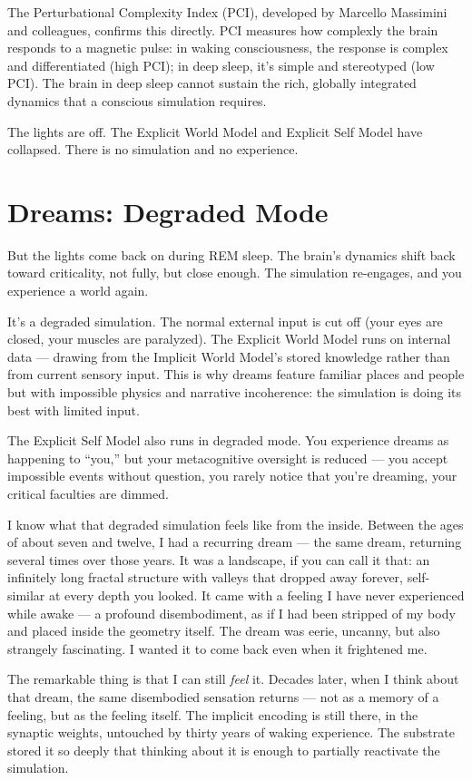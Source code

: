 \documentclass[11pt, twoside, openright]{book}
\begin{document}
The Perturbational Complexity Index (PCI), developed by Marcello Massimini and colleagues, confirms this directly. PCI measures how complexly the brain responds to a magnetic pulse: in waking consciousness, the response is complex and differentiated (high PCI); in deep sleep, it's simple and stereotyped (low PCI). The brain in deep sleep cannot sustain the rich, globally integrated dynamics that a conscious simulation requires.

The lights are off. The Explicit World Model and Explicit Self Model have collapsed. There is no simulation and no experience.

\section*{Dreams: Degraded Mode}

But the lights come back on during REM sleep. The brain's dynamics shift back toward criticality, not fully, but close enough. The simulation re-engages, and you experience a world again.

It's a degraded simulation. The normal external input is cut off (your eyes are closed, your muscles are paralyzed). The Explicit World Model runs on internal data --- drawing from the Implicit World Model's stored knowledge rather than from current sensory input. This is why dreams feature familiar places and people but with impossible physics and narrative incoherence: the simulation is doing its best with limited input.

The Explicit Self Model also runs in degraded mode. You experience dreams as happening to ``you,'' but your metacognitive oversight is reduced --- you accept impossible events without question, you rarely notice that you're dreaming, your critical faculties are dimmed.

I know what that degraded simulation feels like from the inside. Between the ages of about seven and twelve, I had a recurring dream --- the same dream, returning several times over those years. It was a landscape, if you can call it that: an infinitely long fractal structure with valleys that dropped away forever, self-similar at every depth you looked. It came with a feeling I have never experienced while awake --- a profound disembodiment, as if I had been stripped of my body and placed inside the geometry itself. The dream was eerie, uncanny, but also strangely fascinating. I wanted it to come back even when it frightened me.

The remarkable thing is that I can still \textit{feel} it. Decades later, when I think about that dream, the same disembodied sensation returns --- not as a memory of a feeling, but as the feeling itself. The implicit encoding is still there, in the synaptic weights, untouched by thirty years of waking experience. The substrate stored it so deeply that thinking about it is enough to partially reactivate the simulation.
\end{document}
